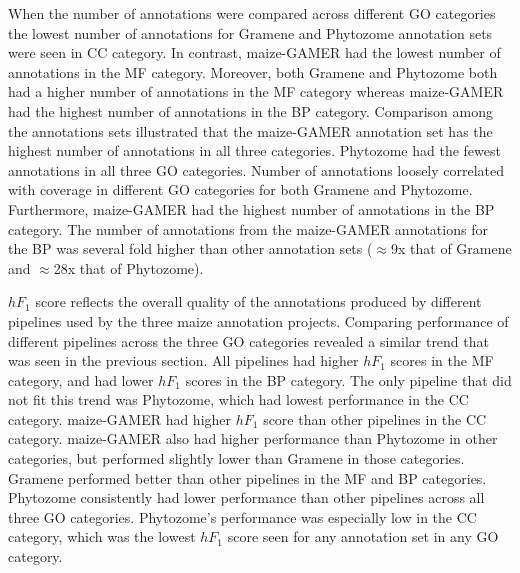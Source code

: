 When the number of annotations were compared across different GO categories the lowest number of annotations for Gramene and Phytozome annotation sets were seen in CC category. In contrast, maize-GAMER had the lowest number of annotations in the MF category. Moreover, both Gramene and Phytozome both had a higher number of annotations in the MF category whereas maize-GAMER had the highest number of annotations in the BP category. Comparison among the annotations sets illustrated that the maize-GAMER annotation set has the highest number of annotations in all three categories. Phytozome had the fewest annotations in all three GO categories. Number of annotations loosely correlated with coverage in different GO categories for both Gramene and Phytozome. Furthermore, maize-GAMER had the highest number of annotations in the BP category. The number of annotations from the maize-GAMER annotations for the BP was several fold higher than other annotation sets ($\approx$9x that of Gramene and $\approx$28x that of Phytozome).

$hF_1$ score reflects the overall quality of the annotations produced by different pipelines used by the three maize annotation projects. Comparing performance of different pipelines across the three GO categories revealed a similar trend that was seen in the previous section. All pipelines had higher $hF_1$ scores in the MF category, and had lower $hF_1$ scores in the BP category. The only pipeline that did not fit this trend was Phytozome, which had lowest performance in the CC category. maize-GAMER had higher $hF_1$ score than other pipelines in the CC category. maize-GAMER also had higher performance than Phytozome in other categories, but performed slightly lower than Gramene in those categories. Gramene performed better than other pipelines in the MF and BP categories. Phytozome consistently had lower performance than other pipelines across all three GO categories. Phytozome's performance was especially low in the CC category, which was the lowest $hF_1$ score seen for any annotation set in any GO category.

